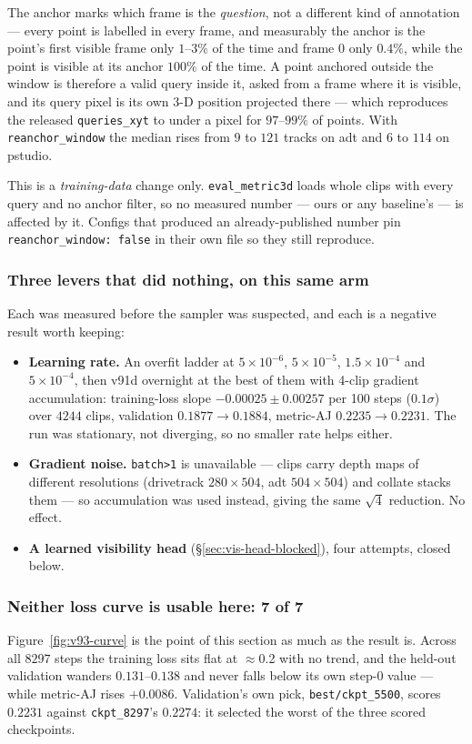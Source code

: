 \documentclass[11pt,a4paper]{article}
\begin{document}
The anchor marks which frame is the \emph{question}, not a different kind of annotation --- every
point is labelled in every frame, and measurably the anchor is the point's first visible frame
only $1$--$3\%$ of the time and frame 0 only $0.4\%$, while the point is visible at its anchor
$100\%$ of the time. A point anchored outside the window is therefore a valid query inside it,
asked from a frame where it is visible, and its query pixel is its own 3-D position projected
there --- which reproduces the released \texttt{queries\_xyt} to under a pixel for $97$--$99\%$ of
points. With \texttt{reanchor\_window} the median rises from $9$ to $121$ tracks on adt and $6$ to
$114$ on pstudio.

This is a \emph{training-data} change only. \texttt{eval\_metric3d} loads whole clips with every
query and no anchor filter, so no measured number --- ours or any baseline's --- is affected by
it. Configs that produced an already-published number pin \texttt{reanchor\_window: false} in
their own file so they still reproduce.

\subsubsection{Three levers that did nothing, on this same arm}
Each was measured before the sampler was suspected, and each is a negative result worth keeping:

\begin{itemize}
  \item \textbf{Learning rate.} An overfit ladder at $5\times10^{-6}$, $5\times10^{-5}$,
        $1.5\times10^{-4}$ and $5\times10^{-4}$, then v91d overnight at the best of them with
        4-clip gradient accumulation: training-loss slope $-0.00025\pm0.00257$ per 100 steps
        ($0.1\sigma$) over $4244$ clips, validation $0.1877\to0.1884$, metric-AJ
        $0.2235\to0.2231$. The run was stationary, not diverging, so no smaller rate helps either.
  \item \textbf{Gradient noise.} \texttt{batch>1} is unavailable --- clips carry depth maps of
        different resolutions (drivetrack $280\times504$, adt $504\times504$) and collate stacks
        them --- so accumulation was used instead, giving the same $\sqrt{4}$ reduction. No effect.
  \item \textbf{A learned visibility head} (\S\ref{sec:vis-head-blocked}), four attempts, closed
        below.
\end{itemize}

\subsubsection{Neither loss curve is usable here: 7 of 7}
\label{sec:v93-curves}
Figure~\ref{fig:v93-curve} is the point of this section as much as the result is. Across all
$8297$ steps the training loss sits flat at $\approx$0.2 with no trend, and the held-out
validation wanders $0.131$--$0.138$ and never falls below its own step-0 value --- while metric-AJ
rises $+0.0086$. Validation's own pick, \texttt{best/ckpt\_5500}, scores $0.2231$ against
\texttt{ckpt\_8297}'s $0.2274$: it selected the worst of the three scored checkpoints.
\end{document}
